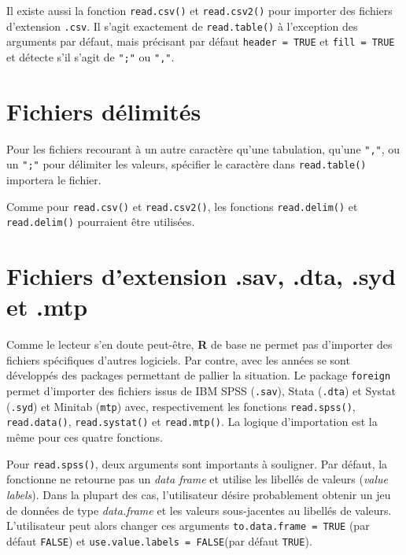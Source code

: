 \documentclass[
]{book}
\newenvironment{Shaded}{}{}
\newcommand{\AttributeTok}[1]{#1}
\newcommand{\FunctionTok}[1]{#1}
\newcommand{\NormalTok}[1]{#1}
\newcommand{\OtherTok}[1]{#1}
\newcommand{\StringTok}[1]{#1}
\begin{document}
Il existe aussi la fonction \texttt{read.csv()} et \texttt{read.csv2()} pour importer des fichiers d'extension \texttt{.csv}. Il s'agit exactement de \texttt{read.table()} à l'exception des arguments par défaut, mais précisant par défaut \texttt{header\ =\ TRUE} et \texttt{fill\ =\ TRUE} et détecte s'il s'agit de \texttt{";"} ou \texttt{","}.

\hypertarget{fichiers-duxe9limituxe9s}{%
\section{Fichiers délimités}\label{fichiers-duxe9limituxe9s}}

Pour les fichiers recourant à un autre caractère qu'une tabulation, qu'une \texttt{","}, ou un \texttt{";"} pour délimiter les valeurs, spécifier le caractère dans \texttt{read.table()} importera le fichier.

\begin{Shaded}
\end{Shaded}

Comme pour \texttt{read.csv()} et \texttt{read.csv2()}, les fonctions \texttt{read.delim()} et \texttt{read.delim()} pourraient être utilisées.

\hypertarget{fichiers-dextension-.sav-.dta-.syd-et-.mtp}{%
\section{Fichiers d'extension .sav, .dta, .syd et .mtp}\label{fichiers-dextension-.sav-.dta-.syd-et-.mtp}}

Comme le lecteur s'en doute peut-être, \textbf{R} de base ne permet pas d'importer des fichiers spécifiques d'autres logiciels. Par contre, avec les années se sont développés des packages permettant de pallier la situation. Le package \texttt{foreign} permet d'importer des fichiers issus de IBM SPSS (\texttt{.sav}), Stata (\texttt{.dta}) et Systat (\texttt{.syd}) et Minitab (\texttt{mtp}) avec, respectivement les fonctions \texttt{read.spss()}, \texttt{read.data()}, \texttt{read.systat()} et \texttt{read.mtp()}. La logique d'importation est la même pour ces quatre fonctions.

Pour \texttt{read.spss()}, deux arguments sont importants à souligner. Par défaut, la fonctionne ne retourne pas un \emph{data frame} et utilise les libellés de valeurs (\emph{value labels}). Dans la plupart des cas, l'utilisateur désire probablement obtenir un jeu de données de type \emph{data.frame} et les valeurs sous-jacentes au libellés de valeurs. L'utilisateur peut alors changer ces arguments \texttt{to.data.frame\ =\ TRUE} (par défaut \texttt{FALSE}) et \texttt{use.value.labels\ =\ FALSE}(par défaut \texttt{TRUE}).
\end{document}
